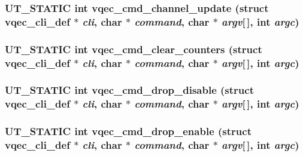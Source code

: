 \subsubsection{\setlength{\rightskip}{0pt plus 5cm}UT\_\-STATIC int vqec\_\-cmd\_\-channel\_\-update (struct \bf{vqec\_\-cli\_\-def} $\ast$ {\em cli}, char $\ast$ {\em command}, char $\ast$ {\em argv}[$\,$], int {\em argc})}\label{vqec__cli__register_8c_d7a3374071d47db8d31c51aaf02e2aa9}


\subsubsection{\setlength{\rightskip}{0pt plus 5cm}UT\_\-STATIC int vqec\_\-cmd\_\-clear\_\-counters (struct \bf{vqec\_\-cli\_\-def} $\ast$ {\em cli}, char $\ast$ {\em command}, char $\ast$ {\em argv}[$\,$], int {\em argc})}\label{vqec__cli__register_8c_5f794aca4f31e68ac4a5a6a746efa353}


\subsubsection{\setlength{\rightskip}{0pt plus 5cm}UT\_\-STATIC int vqec\_\-cmd\_\-drop\_\-disable (struct \bf{vqec\_\-cli\_\-def} $\ast$ {\em cli}, char $\ast$ {\em command}, char $\ast$ {\em argv}[$\,$], int {\em argc})}\label{vqec__cli__register_8c_f86ccf5e13cc73f21c09bc6c3bd798f6}


\subsubsection{\setlength{\rightskip}{0pt plus 5cm}UT\_\-STATIC int vqec\_\-cmd\_\-drop\_\-enable (struct \bf{vqec\_\-cli\_\-def} $\ast$ {\em cli}, char $\ast$ {\em command}, char $\ast$ {\em argv}[$\,$], int {\em argc})}\label{vqec__cli__register_8c_c2826f098026a8fcda9ccbc65b8bb770}


